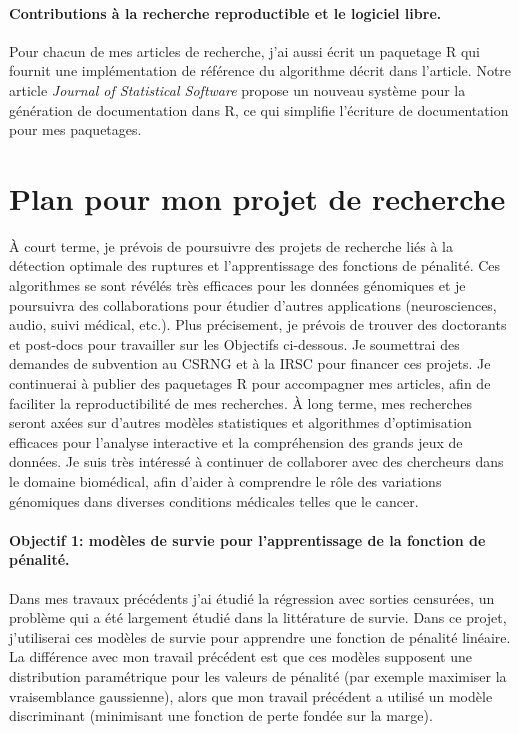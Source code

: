 \documentclass{article}
\begin{document}
\paragraph{Contributions à la recherche reproductible et le logiciel
  libre.} Pour chacun de mes articles de recherche, j'ai aussi écrit
un paquetage R qui fournit une implémentation de référence du
algorithme décrit dans l'article. Notre article \emph{Journal of
  Statistical Software} \citep{hocking13:inlinedocs} propose un
nouveau système pour la génération de documentation dans R, ce qui
simplifie l'écriture de documentation pour mes paquetages.

\section{Plan pour mon projet de recherche}

À court terme, je prévois de poursuivre des projets de recherche liés à
la détection optimale des ruptures et l'apprentissage des fonctions de
pénalité. Ces algorithmes se sont révélés très efficaces pour les
données génomiques et je poursuivra des collaborations pour étudier
d'autres applications (neurosciences, audio, suivi médical,
etc.). Plus précisement, je prévois de trouver des doctorants et
post-docs pour travailler sur les Objectifs ci-dessous. Je soumettrai
des demandes de subvention au CSRNG et à la IRSC pour financer ces
projets. Je continuerai à publier des paquetages R pour accompagner
mes articles, afin de faciliter la reproductibilité de mes
recherches. À long terme, mes recherches seront axées sur d'autres
modèles statistiques et algorithmes d'optimisation efficaces pour
l'analyse interactive et la compréhension des grands jeux de
données. Je suis très intéressé à continuer de collaborer
avec des chercheurs dans le domaine biomédical, afin d'aider à
comprendre le rôle des variations génomiques dans diverses
conditions médicales telles que le cancer.

\paragraph{Objectif 1: modèles de survie pour l'apprentissage de la
  fonction de pénalité.} Dans mes travaux précédents j'ai étudié la
régression avec sorties censurées, un problème qui a été largement
étudié dans la littérature de survie. Dans ce projet, j'utiliserai ces
modèles de survie pour apprendre une fonction de pénalité linéaire. La
différence avec mon travail précédent est que ces modèles supposent
une distribution paramétrique pour les valeurs de pénalité (par
exemple maximiser la vraisemblance gaussienne), alors que mon travail
précédent a utilisé un modèle discriminant (minimisant une fonction de
perte fondée sur la marge).
\end{document}
